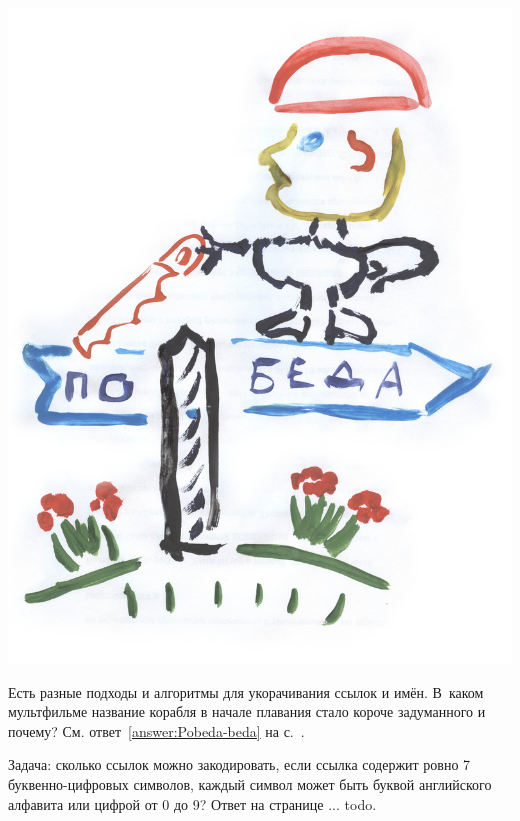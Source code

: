 \begin{marginfigure}[-4cm]
{%
\setlength{\fboxsep}{0pt}%
\setlength{\fboxrule}{1pt}%
\includegraphics{./graphics/sketch/short_link_knauff_pobeda_v3.jpg}
}%

\caption{Есть разные подходы и алгоритмы для укорачивания ссылок и имён. В~каком 
    мультфильме название корабля в начале плавания стало короче задуманного и почему?
    См. ответ~\ref{answer:Pobeda-beda} на с.~\pageref{answer:Pobeda-beda}.}
\label{fig:Pobeda-beda}
\end{marginfigure}

Задача: сколько ссылок можно закодировать, 
        если ссылка содержит ровно 7 буквенно-цифровых символов,
        каждый символ может быть буквой английского алфавита 
        или цифрой от 0 до 9? Ответ на странице ... todo.

